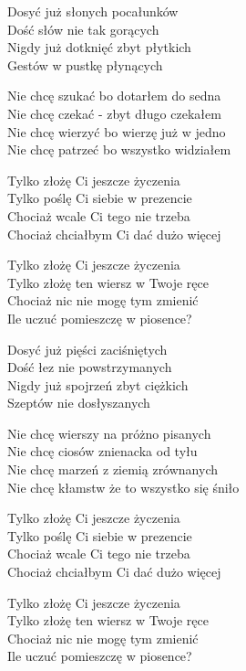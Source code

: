 \begin{text}
Dosyć już słonych pocałunków\\
Dość słów nie tak gorących\\
Nigdy już dotknięć zbyt płytkich\\
Gestów w pustkę płynących

Nie chcę szukać bo dotarłem do sedna\\
Nie chcę czekać - zbyt długo czekałem\\
Nie chcę wierzyć bo wierzę już w jedno\\
Nie chcę patrzeć bo wszystko widziałem

Tylko złożę Ci jeszcze życzenia\\
Tylko poślę Ci siebie w prezencie\\
Chociaż wcale Ci tego nie trzeba\\
Chociaż chciałbym Ci dać dużo więcej

Tylko złożę Ci jeszcze życzenia\\
Tylko złożę ten wiersz w Twoje ręce\\
Chociaż nic nie mogę tym zmienić\\
Ile uczuć pomieszczę w piosence?

Dosyć już pięści zaciśniętych\\
Dość łez nie powstrzymanych\\
Nigdy już spojrzeń zbyt ciężkich\\
Szeptów nie dosłyszanych

Nie chcę wierszy na próżno pisanych\\
Nie chcę ciosów znienacka od tyłu\\
Nie chcę marzeń z ziemią zrównanych\\
Nie chcę kłamstw że to wszystko się śniło

Tylko złożę Ci jeszcze życzenia\\
Tylko poślę Ci siebie w prezencie\\
Chociaż wcale Ci tego nie trzeba\\
Chociaż chciałbym Ci dać dużo więcej

Tylko złożę Ci jeszcze życzenia\\
Tylko złożę ten wiersz w Twoje ręce\\
Chociaż nic nie mogę tym zmienić\\
Ile uczuć pomieszczę w piosence?
\end{text}
